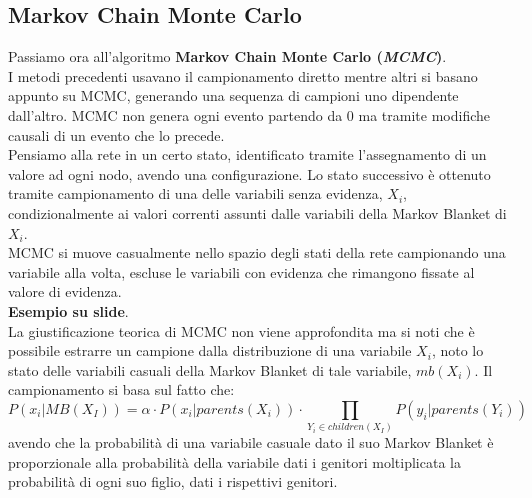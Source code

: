\documentclass[a4paper,12pt, oneside]{book}
\begin{document}
\subsection{Markov Chain Monte Carlo}
Passiamo ora all'algoritmo \textbf{Markov Chain Monte Carlo (\textit{MCMC})}.\\
I metodi precedenti usavano il campionamento diretto mentre altri si basano
appunto su MCMC, generando una sequenza di campioni uno dipendente
dall'altro. MCMC non genera ogni evento partendo da 0 ma tramite modifiche
causali di un evento che lo precede. \\
Pensiamo alla rete in un certo stato, identificato tramite l'assegnamento di un
valore ad ogni nodo, avendo una configurazione. Lo stato successivo è ottenuto
tramite campionamento di una delle variabili senza evidenza, $X_i$,
condizionalmente ai valori correnti assunti dalle variabili della Markov Blanket
di $X_i$.\\
MCMC si muove casualmente nello spazio degli stati della rete
campionando una variabile alla volta, escluse le variabili con evidenza che
rimangono fissate al valore di evidenza.\\
\textbf{Esempio su slide}.\\
La giustificazione teorica di MCMC non viene approfondita ma si noti che è
possibile estrarre un campione dalla distribuzione di una variabile $X_i$, noto
lo stato delle variabili casuali della Markov Blanket di tale variabile,
$mb(X_i)$. Il campionamento si basa sul fatto che:
\[P(x_i|MB(X_I))=\alpha\cdot P(x_i|parents(X_i))\cdot \prod_{Y_i\in
    children(X_I)}P(y_i|parents (Y_i))\]
avendo che la probabilità di una variabile casuale dato il suo Markov Blanket è
proporzionale alla probabilità della variabile dati i genitori moltiplicata la
probabilità di ogni suo figlio, dati i rispettivi genitori.
\end{document}
